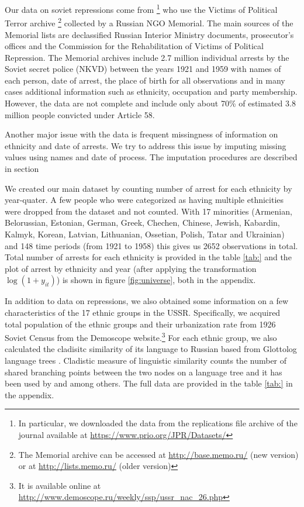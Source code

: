 Our data on soviet repressions come from  \citet{zhukov_stalins_2018}\footnote{In particular, we downloaded the data from the replications file archive of the journal available  at \url{https://www.prio.org/JPR/Datasets/}} who use  the Victims of Political Terror archive \footnote{The Memorial archive can be accessed at \url{http://base.memo.ru/} (new version) or at \url{http://lists.memo.ru/} (older version)} collected by a Russian NGO Memorial. The main sources of the Memorial lists are declassified Russian Interior Ministry documents, prosecutor’s offices and the Commission for the Rehabilitation of Victims of Political Repression.
 The Memorial archives include 2.7 million individual arrests by the Soviet secret police (NKVD) between  the years 1921 and 1959 with names of each person, date of arrest, the place of birth for all observations and  in many cases additional information such as ethnicity, occupation and party membership. 
 However, the data are not complete and include only about 70\% of estimated 3.8  million people convicted under Article 58.

Another major issue with the data is frequent  missingness of information on ethnicity and date of arrests. 
We try to address this issue by imputing missing values using names and date of process. The imputation procedures are described in section 

We created our main dataset by counting number of arrest for each ethnicity by year-quater.  A few people who were categorized as having multiple ethnicities were dropped from the dataset and not counted. 
With 17  minorities (Armenian, Belorussian, Estonian, German, Greek, Chechen, Chinese, Jewish, Kabardin, Kalmyk, Korean, Latvian, Lithuanian, Ossetian, Polish, Tatar and Ukrainian) and 148 time periods (from 1921 to 1958) this gives us 2652 observations in total. Total number of arrests for each ethnicity is provided in the table \ref{tab:} and the plot of arrest by ethnicity and year (after applying the transformation $\log\left(1 + y_{it}\right)$) is shown in figure \ref{fig:universe}, both in the appendix. 

In addition to data on repressions, we also obtained some information on a few characteristics of the 17 ethnic groups in the USSR. 
Specifically, we acquired total population of the ethnic groups and their urbanization rate from 1926 Soviet Census from the Demoscope website.\footnote{It is available online at \url{http://www.demoscope.ru/weekly/ssp/ussr_nac_26.php}} For each ethnic group, we also calculated the cladisitc similarity of its language to Russian based from Glottolog language trees \citep{hammarstrom_glottolog_2018}.
Cladistic measure of linguistic similarity counts the number of shared branching points between the two nodes on a language tree and it has been used by \citet{fearon_ethnic_2003} and \citet{dickens_ethnolinguistic_2018} among others. 
The full data are provided in the table \ref{tab:} in the appendix.
